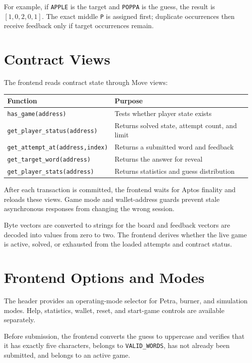\documentclass[10pt]{article}
\begin{document}
For example, if \texttt{APPLE} is the target and \texttt{POPPA} is the guess, the result is \([1,0,2,0,1]\). The exact middle \texttt{P} is assigned first; duplicate occurrences then receive feedback only if target occurrences remain.

\section{Contract Views}

The frontend reads contract state through Move views:

\begin{center}
\begin{tabular}{@{}p{}p{}@{}}
\toprule
Function & Purpose\\
\midrule
\texttt{has\_game(address)} & Tests whether player state exists\\
\texttt{get\_player\_status(address)} & Returns solved state, attempt count, and limit\\
\texttt{get\_attempt\_at(address,index)} & Returns a submitted word and feedback\\
\texttt{get\_target\_word(address)} & Returns the answer for reveal\\
\texttt{get\_player\_stats(address)} & Returns statistics and guess distribution\\
\bottomrule
\end{tabular}
\end{center}

After each transaction is committed, the frontend waits for Aptos finality and reloads these views. Game mode and wallet-address guards prevent stale asynchronous responses from changing the wrong session.

Byte vectors are converted to strings for the board and feedback vectors are decoded into values from zero to two. The frontend derives whether the live game is active, solved, or exhausted from the loaded attempts and contract status.

\section{Frontend Options and Modes}

The header provides an operating-mode selector for Petra, burner, and simulation modes. Help, statistics, wallet, reset, and start-game controls are available separately.

Before submission, the frontend converts the guess to uppercase and verifies that it has exactly five characters, belongs to \texttt{VALID\_WORDS}, has not already been submitted, and belongs to an active game.
\end{document}
